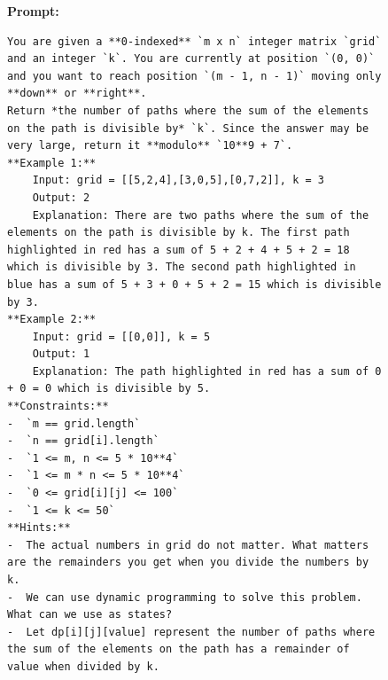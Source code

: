 \begin{figure}[H]
\begin{AIbox}{\DV}
{\bf{Prompt:}}
\begin{verbatim}
You are given a **0-indexed** `m x n` integer matrix `grid` and an integer `k`. You are currently at position `(0, 0)` and you want to reach position `(m - 1, n - 1)` moving only **down** or **right**.
Return *the number of paths where the sum of the elements on the path is divisible by* `k`. Since the answer may be very large, return it **modulo** `10**9 + 7`.
**Example 1:**
    Input: grid = [[5,2,4],[3,0,5],[0,7,2]], k = 3
    Output: 2
    Explanation: There are two paths where the sum of the elements on the path is divisible by k. The first path highlighted in red has a sum of 5 + 2 + 4 + 5 + 2 = 18 which is divisible by 3. The second path highlighted in blue has a sum of 5 + 3 + 0 + 5 + 2 = 15 which is divisible by 3.
**Example 2:**
    Input: grid = [[0,0]], k = 5
    Output: 1
    Explanation: The path highlighted in red has a sum of 0 + 0 = 0 which is divisible by 5.
**Constraints:**
-  `m == grid.length`
-  `n == grid[i].length`
-  `1 <= m, n <= 5 * 10**4`
-  `1 <= m * n <= 5 * 10**4`
-  `0 <= grid[i][j] <= 100`
-  `1 <= k <= 50`
**Hints:**
-  The actual numbers in grid do not matter. What matters are the remainders you get when you divide the numbers by k.
-  We can use dynamic programming to solve this problem. What can we use as states?
-  Let dp[i][j][value] represent the number of paths where the sum of the elements on the path has a remainder of value when divided by k.
\end{verbatim}



\end{AIbox}
\end{figure}
